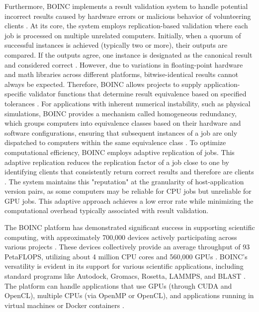 Furthermore, \ac{BOINC} implements a result validation system to handle potential incorrect results caused by hardware errors or malicious behavior of volunteering clients \cite{relatedwork:boinc1}. At its core, the system employs replication-based validation where each job is processed on multiple unrelated computers. Initially, when a quorum of successful instances is achieved (typically two or more), their outputs are compared. If the outputs agree, one instance is designated as the canonical result and considered correct \cite{relatedwork:boinc1}. However, due to variations in floating-point hardware and math libraries across different platforms, bitwise-identical results cannot always be expected. Therefore, \ac{BOINC} allows projects to supply application-specific validator functions that determine result equivalence based on specified tolerances \cite{relatedwork:boinc1}. For applications with inherent numerical instability, such as physical simulations, \ac{BOINC} provides a mechanism called homogeneous redundancy, which groups computers into equivalence classes based on their hardware and software configurations, ensuring that subsequent instances of a job are only dispatched to computers within the same equivalence class \cite{relatedwork:boinc1}. To optimize computational efficiency, \ac{BOINC} employs adaptive replication of jobs. This adaptive replication reduces the replication factor of a job close to one by identifying clients that consistently return correct results and therefore are clients \cite{relatedwork:boinc1}. The system maintains this "reputation" at the granularity of host-application version pairs, as some computers may be reliable for \acs{CPU} jobs but unreliable for \acs{GPU} jobs. This adaptive approach achieves a low error rate while minimizing the computational overhead typically associated with result validation.

The \ac{BOINC} platform has demonstrated significant success in supporting scientific computing, with approximately 700,000 devices actively participating across various projects \cite{relatedwork:boinc1}. These devices collectively provide an average throughput of 93 Peta\ac{FLOPS}, utilizing about 4 million \acs{CPU} cores and 560,000 \acs{GPU}s \cite{relatedwork:boinc1}. \ac{BOINC}'s versatility is evident in its support for various scientific applications, including standard programs like Autodock, Gromacs, Rosetta, LAMMPS, and BLAST \cite{relatedwork:boinc1}. The platform can handle applications that use GPUs (through CUDA and OpenCL), multiple CPUs (via OpenMP or OpenCL), and applications running in virtual machines or Docker containers \cite{relatedwork:boinc1}.

